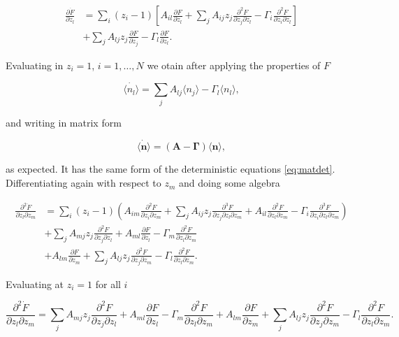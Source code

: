 \begin{equation*}
\begin{split}
\frac{\partial \dot{F}}{\partial z_l} &= \sum_i(z_i-1)\left[A_{il}\frac{\partial F}{\partial z_l}+\sum_jA_{ij}z_j\frac{\partial^2 F}{\partial z_j\partial z_l}-\Gamma_i\frac{\partial^2 F}{\partial z_i\partial z_l}\right]\\
&+\sum_jA_{lj}z_j\frac{\partial F}{\partial z_j}-\Gamma_l\frac{\partial F}{\partial z_l}.
\end{split}
\end{equation*}

Evaluating in $z_i=1$, $i=1,\dotsc,N$ we otain after applying the properties of $F$

\begin{equation*}
\dot{\langle n_l \rangle} = \sum_jA_{lj}\langle n_j\rangle-\Gamma_l\langle n_l\rangle,
\end{equation*}

and writing in matrix form

\begin{equation}
  \label{eq:mas-general_ave}
  \dot{\langle \mathbf{n}\rangle} = (\mathbf{A}-\mathbf{\Gamma})\langle \mathbf{n}\rangle,
\end{equation}

as expected. It has the same form of the deterministic equations \eqref{eq:matdet}. Differentiating again with respect to $z_m$ and doing some algebra

\begin{equation*}
  \begin{split}
    \frac{\partial^2 \dot{F}}{\partial z_l \partial z_m} &= \sum_i(z_i-1) \left(A_{im}\frac{\partial^2F}{\partial z_i \partial z_m} + \sum_jA_{ij}z_j\frac{\partial^3F}{\partial z_j \partial z_l \partial z_m}+A_{il}\frac{\partial^2F}{\partial z_l\partial z_m} - \Gamma_i\frac{\partial^3F}{\partial z_i \partial z_l \partial z_m}   \right)\\
    &+\sum_jA_{mj}z_j\frac{\partial^2F}{\partial z_j\partial z_l}+A_{ml}\frac{\partial F}{\partial z_l} - \Gamma_m\frac{\partial^2F}{\partial z_l\partial z_m}\\
    &+ A_{lm}\frac{\partial F}{\partial z_m} + \sum_jA_{lj}z_j\frac{\partial^2F}{\partial z_j\partial z_m}-\Gamma_l\frac{\partial^2F}{\partial z_l\partial z_m}.
  \end{split}
\end{equation*}

Evaluating at $z_i=1$ for all $i$

\begin{equation*}
  \frac{\partial^2\dot{F}}{\partial z_l \partial z_m} = \sum_jA_{mj}z_j\frac{\partial^2F}{\partial z_j\partial z_l}+A_{ml}\frac{\partial F}{\partial z_l} - \Gamma_m\frac{\partial^2F}{\partial z_l\partial z_m} + A_{lm}\frac{\partial F}{\partial z_m} + \sum_jA_{lj}z_j\frac{\partial^2F}{\partial z_j\partial z_m}-\Gamma_l\frac{\partial^2F}{\partial z_l\partial z_m}.
\end{equation*}

